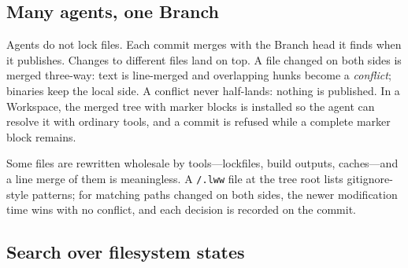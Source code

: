 \documentclass[letterpaper,twocolumn,10pt]{article}
\newcommand{\ws}{Workspace}
\begin{document}
\subsection{Many agents, one Branch}
\label{sec:merge}

Agents do not lock files. Each commit merges with the Branch head it finds
when it publishes. Changes to different files land on top. A file changed
on both sides is merged three-way: text is line-merged and overlapping hunks
become a \emph{conflict}; binaries keep the local side. A conflict never
half-lands: nothing is published. In a \ws{}, the merged tree with marker
blocks is installed so the agent can resolve it with ordinary tools, and a
commit is refused while a complete marker block remains.

Some files are rewritten wholesale by tools---lockfiles, build outputs,
caches---and a line merge of them is meaningless. A \texttt{/.lww} file at
the tree root lists gitignore-style patterns; for matching paths changed on
both sides, the newer modification time wins with no conflict, and each
decision is recorded on the commit.

\subsection{Search over filesystem states}
\label{sec:search}
\end{document}

